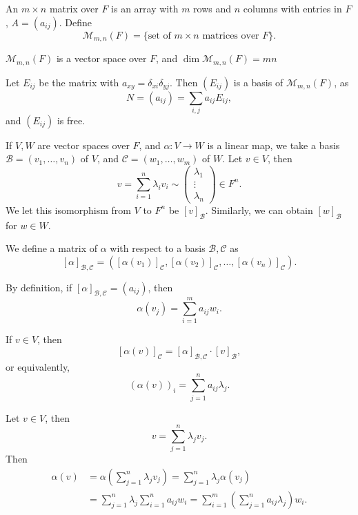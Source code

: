 \documentclass[12pt]{article}
\begin{document}
\begin{definition}
	An $m \times n$ matrix over $F$ is an array with $m$ rows and $n$ columns with entries in $F$, $A = (a_{ij})$. Define
	\[
		\mathcal{M}_{m, n}(F) = \{\text{set of } m \times n \text{ matrices over } F\}
	.\]
\end{definition}

\begin{proposition}
	$\mathcal{M}_{m, n}(F)$ is a vector space over $F$, and $\dim \mathcal{M}_{m, n}(F) = mn$
\end{proposition}

\begin{proofbox}
	Let $E_{ij}$ be the matrix with $a_{xy} = \delta_{xi}\delta_{yj}$. Then $(E_{ij})$ is a basis of $\mathcal{M}_{m, n}(F)$, as
	\[
		N = (a_{ij}) = \sum_{i, j}a_{ij} E_{ij}
	,\]
	and $(E_{ij})$ is free.
\end{proofbox}

If $V, W$ are vector spaces over $F$, and $\alpha : V \to W$ is a linear map, we take a basis $\mathcal{B} = (v_1, \ldots, v_n)$ of $V$, and $\mathcal{C} = (w_1, \ldots, w_m)$ of $W$. Let $v \in V$, then
\[
v = \sum_{i = 1}^{n} \lambda_i v_i \sim
\begin{pmatrix}
	\lambda_1 \\
	\vdots \\
	\lambda_n
\end{pmatrix}
 \in F^{n}
.\]
We let this isomorphism from $V$ to $F^{n}$ be $[v]_{\mathcal{B}}$. Similarly, we can obtain $[w]_{\mathcal{B}}$ for $w \in W$.

\begin{definition}
	We define a matrix of $\alpha$ with respect to a basis $\mathcal{B}, \mathcal{C}$ as
	\[
		[\alpha]_{\mathcal{B}, \mathcal{C}} = ([\alpha(v_1)]_{\mathcal{C}}, [\alpha(v_2)]_{\mathcal{C}}, \ldots, [\alpha(v_n)]_{\mathcal{C}})
	.\]
\end{definition}

By definition, if $[\alpha]_{\mathcal{B}, \mathcal{C}} = (a_{ij})$, then
\[
	\alpha(v_j) = \sum_{i = 1}^{m} a_{ij} w_i
.\]

\begin{lemma}
	If $v \in V$, then
	\[
		[\alpha(v)]_{\mathcal{C}} = [\alpha]_{\mathcal{B}, \mathcal{C}} \cdot [v]_{\mathcal{B}}
	,\]
	or equivalently,
	\[
		(\alpha (v))_{i} = \sum_{j = 1}^{n} a_{ij} \lambda_j
	.\] 
\end{lemma}

\begin{proofbox}
	Let $v \in V$, then
\[
v = \sum_{j = 1}^{n} \lambda_j v_j
.\]
Then
 \begin{align*}
	 \alpha(v) &= \alpha \left( \sum_{j = 1}^{n} \lambda_j v_j \right) = \sum_{j = 1}^{n} \lambda_j \alpha(v_j) \\
		   &= \sum_{j = 1}^{n} \lambda_j \sum_{i = 1}^{n} a_{ij} w_i = \sum_{i = 1}^{m} \left( \sum_{j = 1}^{n} a_{ij} \lambda_j \right) w_i.
\end{align*}
\end{proofbox}
\end{document}
